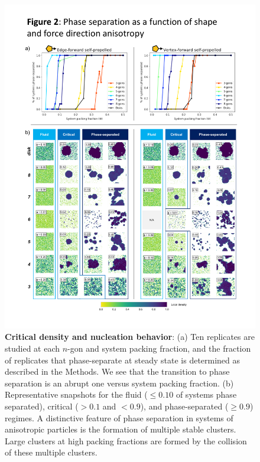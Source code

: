 \newpage
\vfill

\begin{figure}[!ht]
\begin{center}
\includegraphics[width=6in]{../Figures/Fig2.pdf}
\caption{
\textbf{Critical density and nucleation behavior}:
(a) Ten replicates are studied at each $n$-gon and system packing fraction, and the fraction of replicates that phase-separate at steady state is determined as described in the Methods.
We see that the transition to phase separation is an abrupt one versus system packing fraction.
(b) Representative snapshots for the fluid (${\leq}0.10$ of systems phase separated), critical ($>0.1$ and $<0.9$), and phase-separated (${\geq}0.9$) regimes.
A distinctive feature of phase separation in systems of anisotropic particles is the formation of multiple stable clusters.
Large clusters at high packing fractions are formed by the collision of these multiple clusters.
}
\label{fig:phase_diagram}
\end{center}
\end{figure}

